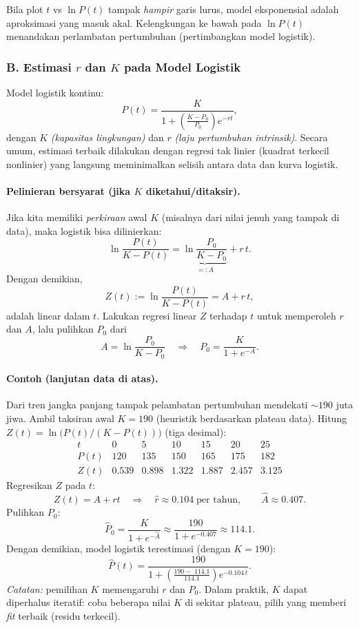 \documentclass{bukumjh}
\begin{document}
\medskip
{} Bila plot $t$ vs $\ln P(t)$ tampak \emph{hampir} garis lurus, model eksponensial adalah aproksimasi yang masuk akal. Kelengkungan ke bawah pada $\ln P(t)$ menandakan perlambatan pertumbuhan (pertimbangkan model logistik).

\subsubsection*{B. Estimasi $r$ dan $K$ pada Model Logistik}
Model logistik kontinu:
\[
P(t)=\frac{K}{1+\left(\frac{K-P_0}{P_0}\right)e^{-rt}},
\]
dengan $K$ \textit{(kapasitas lingkungan)} dan $r$ \textit{(laju pertumbuhan intrinsik)}.
Secara umum, estimasi terbaik dilakukan dengan {\jsg regresi tak linier} (kuadrat terkecil nonlinier) yang langsung meminimalkan selisih antara data dan kurva logistik.

\paragraph{Pelinieran bersyarat (jika $K$ diketahui/ditaksir).}
Jika kita memiliki \emph{perkiraan} awal $K$ (misalnya dari nilai jenuh yang tampak di data), maka logistik bisa dilinierkan:
\[
\ln\!\frac{P(t)}{K-P(t)}=\underbrace{\ln\!\frac{P_0}{K-P_0}}_{=:A}+r\,t.
\]
Dengan demikian,
\[
Z(t):=\ln\!\frac{P(t)}{K-P(t)} = A + r\,t,
\]
adalah {\jsg linear} dalam $t$. Lakukan regresi linear $Z$ terhadap $t$ untuk memperoleh $r$ dan $A$, lalu pulihkan $P_0$ dari
\[
A=\ln\!\frac{P_0}{K-P_0}
\quad\Longrightarrow\quad
P_0=\frac{K}{1+e^{-A}}.
\]

\paragraph{Contoh (lanjutan data di atas).}
Dari tren jangka panjang tampak pelambatan pertumbuhan mendekati $\sim\!190$ juta jiwa.
Ambil taksiran awal $K=190$ (heuristik berdasarkan plateau data).
Hitung $Z(t)=\ln\bigl(P(t)/(K-P(t))\bigr)$ (tiga desimal):
\[
\begin{array}{c|cccccc}
t & 0 & 5 & 10 & 15 & 20 & 25\\\hline
P(t) & 120 & 135 & 150 & 165 & 175 & 182\\
Z(t) & 0.539 & 0.898 & 1.322 & 1.887 & 2.457 & 3.125
\end{array}
\]
Regresikan $Z$ pada $t$:
\[
Z(t)=A+rt \quad\Rightarrow\quad
\hat r \approx 0.104\;\text{per tahun},\qquad \hat A \approx 0.407.
\]
Pulihkan $P_0$:
\[
\hat P_0=\frac{K}{1+e^{-\hat A}} \approx \frac{190}{1+e^{-0.407}} \approx 114.1.
\]
Dengan demikian, model logistik terestimasi (dengan $K=190$):
\[
\widehat{P}(t)=\frac{190}{1+\left(\frac{190-\;114.1}{114.1}\right)e^{-0.104\,t}}.
\]
\textit{Catatan:} pemilihan $K$ memengaruhi $r$ dan $P_0$. Dalam praktik, $K$ dapat diperhalus iteratif: coba beberapa nilai $K$ di sekitar plateau, pilih yang memberi \emph{fit} terbaik (residu terkecil).
\end{document}
